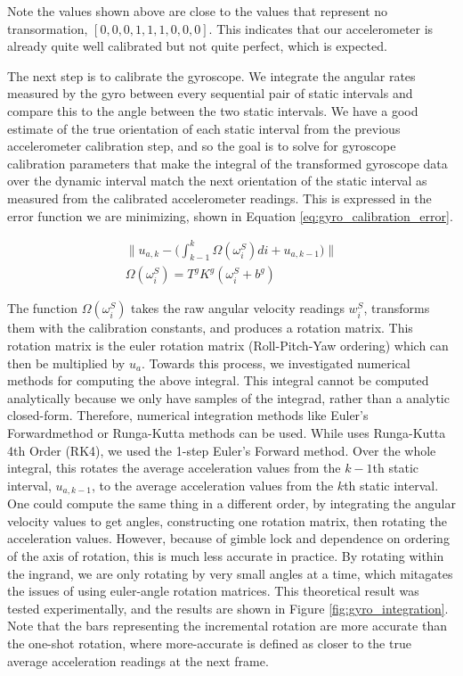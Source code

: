 \documentclass{article}
\begin{document}
    Note the values shown above are close to the values that represent no transormation, $[0, 0, 0, 1, 1, 1, 0, 0, 0]$. This indicates that our accelerometer is already quite well calibrated but not quite perfect, which is expected.

    The next step is to calibrate the gyroscope. We integrate the angular rates measured by the gyro between every sequential pair of static intervals and compare this to the angle between the two static intervals. We have a good estimate of the true orientation of each static interval from the previous accelerometer calibration step, and so the goal is to solve for gyroscope calibration parameters that make the integral of the transformed gyroscope data over the dynamic interval match the next orientation of the static interval as measured from the calibrated accelerometer readings. This is expressed in the error function we are minimizing, shown in Equation \ref{eq:gyro_calibration_error}.

    \begin{equation} \label{eq:gyro_calibration_error}
      \begin{split}
        \bigg\lVert u_{a,k} - \bigg(\int_{k-1}^{k} \Omega(\omega^S_i)di + u_{a,k-1}\bigg) \bigg\lVert \\
      \Omega(\omega^S_i) = T^gK^g(\omega^S_i+b^g)
      \end{split}
    \end{equation}

    The function $\Omega(\omega^S_i)$ takes the raw angular velocity readings $w^S_i$, transforms them with the calibration constants, and produces a rotation matrix. This rotation matrix is the euler rotation matrix (Roll-Pitch-Yaw ordering) which can then be multiplied by $u_a$. Towards this process, we investigated numerical methods for computing the above integral. This integral cannot be computed analytically because we only have samples of the integrad, rather than a analytic closed-form. Therefore, numerical integration methods like Euler's Forwardmethod or Runga-Kutta methods can be used. While \cite{tedaldi_robust_2014} uses Runga-Kutta 4th Order (RK4), we used the 1-step Euler's Forward method. Over the whole integral, this rotates the average acceleration values from the $k-1$th static interval, $u_{a,k-1}$, to the average acceleration values from the $k$th static interval. One could compute the same thing in a different order, by integrating the angular velocity values to get angles, constructing one rotation matrix, then rotating the acceleration values. However, because of gimble lock and dependence on ordering of the axis of rotation, this is much less accurate in practice. By rotating within the ingrand, we are only rotating by very small angles at a time, which mitagates the issues of using euler-angle rotation matrices. This theoretical result was tested experimentally, and the results are shown in Figure \ref{fig:gyro_integration}. Note that the bars representing the incremental rotation are more accurate than the one-shot rotation, where more-accurate is defined as closer to the true average acceleration readings at the next frame.
\end{document}
